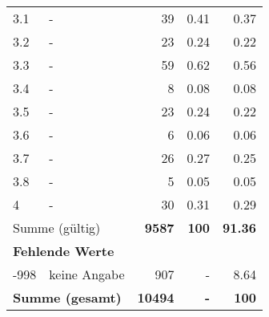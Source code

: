 \begin{longtable}{lXrrr}
        3.1 & \multicolumn{1}{X}{-} & %
          \num{39} &
          \num[round-mode=places,round-precision=2]{0,41} &
          \num[round-mode=places,round-precision=2]{0,37} \\

        3.2 & \multicolumn{1}{X}{-} & %
          \num{23} &
          \num[round-mode=places,round-precision=2]{0,24} &
          \num[round-mode=places,round-precision=2]{0,22} \\

        3.3 & \multicolumn{1}{X}{-} & %
          \num{59} &
          \num[round-mode=places,round-precision=2]{0,62} &
          \num[round-mode=places,round-precision=2]{0,56} \\

        3.4 & \multicolumn{1}{X}{-} & %
          \num{8} &
          \num[round-mode=places,round-precision=2]{0,08} &
          \num[round-mode=places,round-precision=2]{0,08} \\

        3.5 & \multicolumn{1}{X}{-} & %
          \num{23} &
          \num[round-mode=places,round-precision=2]{0,24} &
          \num[round-mode=places,round-precision=2]{0,22} \\

        3.6 & \multicolumn{1}{X}{-} & %
          \num{6} &
          \num[round-mode=places,round-precision=2]{0,06} &
          \num[round-mode=places,round-precision=2]{0,06} \\

        3.7 & \multicolumn{1}{X}{-} & %
          \num{26} &
          \num[round-mode=places,round-precision=2]{0,27} &
          \num[round-mode=places,round-precision=2]{0,25} \\

        3.8 & \multicolumn{1}{X}{-} & %
          \num{5} &
          \num[round-mode=places,round-precision=2]{0,05} &
          \num[round-mode=places,round-precision=2]{0,05} \\

        4 & \multicolumn{1}{X}{-} & %
          \num{30} &
          \num[round-mode=places,round-precision=2]{0,31} &
          \num[round-mode=places,round-precision=2]{0,29} \\

     \midrule
     \multicolumn{2}{l}{Summe (gültig)} &
       \textbf{\num{9587}} &
     \textbf{100} &
       \textbf{\num[round-mode=places,round-precision=2]{91,36}} \\
     \multicolumn{5}{l}{\textbf{Fehlende Werte}}\\
       -998 &
       keine Angabe &
         \num{907} &
        - &
         \num[round-mode=places,round-precision=2]{8,64} \\
     \midrule
     \multicolumn{2}{l}{\textbf{Summe (gesamt)}} &
          \textbf{\num{10494}} &
        \textbf{-} &
        \textbf{100} \\
     \bottomrule
     \end{longtable}
     
